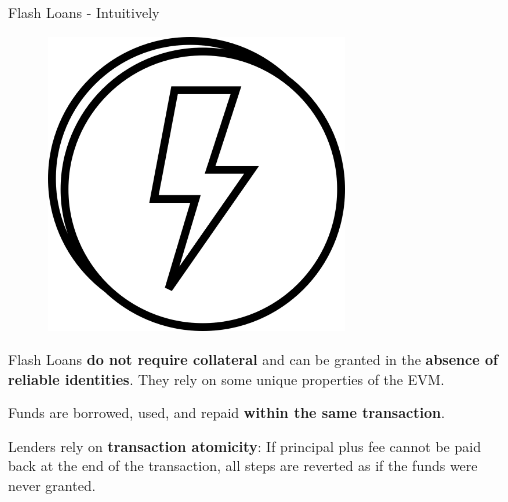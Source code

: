 \documentclass[]{beamer}
\begin{document}
\begin{frame}{Flash Loans - Intuitively}

\begin{minipage}{0.3\textwidth}
	\begin{figure}
		\includegraphics[width=0.7\textwidth]{../assets/images/flashloan}	
	\end{figure}
\end{minipage}
\begin{minipage}{0.65\textwidth}
Flash Loans \textbf{do not require collateral} and can be granted in the \textbf{absence of reliable identities}. They rely on some unique properties of the EVM.
\end{minipage}

\vspace{2em}

 {
\begin{minipage}{0.6\textwidth}

	Funds are borrowed, used, and repaid \textbf{within the same transaction}.

	\vspace{1em}
	Lenders rely on \textbf{transaction atomicity}: If principal plus fee cannot be paid back at the end of the transaction, all steps are reverted as if the funds were never granted.
	
\end{minipage}
\begin{minipage}{0.38\textwidth}
	\begin{figure}
		\begin{tikzpicture}[scale=0.8, every node/.style={scale=0.8}]
			
		\end{tikzpicture}	
	\end{figure}
\end{minipage}
}
\vspace{0.5em}


\end{frame}
\end{document}
